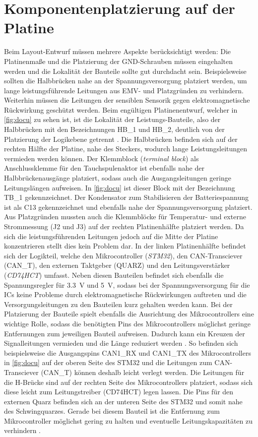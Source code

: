\section{Komponentenplatzierung auf der Platine}\label{sec:bau}
Beim Layout-Entwurf müssen mehrere Aspekte berücksichtigt werden: Die Platinenmaße und die Platzierung der GND-Schrauben müssen eingehalten werden und die Lokalität der Bauteile sollte gut durchdacht sein. Beispielsweise sollten die Halbbrücken nahe an der Spannungsversorgung platziert werden, um lange leistungsführende Leitungen aus EMV- und Platzgründen zu verhindern. Weiterhin müssen die Leitungen der sensiblen Sensorik gegen elektromagnetische Rückwirkung geschützt werden. Beim engültigen Platinenentwurf, welcher in \autoref{fig:docu} zu sehen ist, ist die Lokalität der Leistungs-Bauteile, also der Halbbrücken mit den Bezeichnungen HB\_1 und HB\_2, deutlich von der Platzierung der Logikebene getrennt \cite[S.26]{emcdes}. Die Halbbrücken befinden sich auf der rechten Hälfte der Platine, nahe des Steckers, wodurch lange Leistungsleitungen vermieden werden können. Der Klemmblock (\textit{terminal block}) als Anschlussklemme für den Tauchspulenaktor ist ebenfalls nahe der Halbbrückenausgänge platziert, sodass auch die Ausgangsleitungen geringe Leitungslängen aufweisen. In \autoref{fig:docu} ist dieser Block mit der Bezeichnung TB\_1 gekennzeichnet. Der Kondensator zum Stabilisieren der Batteriespannung ist als C13 gekennzeichnet und ebenfalls nahe der Spannungsversorgung platziert. Aus Platzgründen mussten auch die Klemmblöcke für Temperatur- und externe Strommessung (J2 und J3) auf der rechten Platinenhälfte platziert werden. Da sich die leistungsführenden Leitungen jedoch auf die Mitte der Platine konzentrieren stellt dies kein Problem dar. In der linken Platinenhälfte befindet sich der Logikteil, welche den Mikrocontroller (\textit{STM32}), den CAN-Transciever (CAN\_T), den externen Taktgeber (QUARZ) und den Leitungsverstärker (\textit{CD74HCT}) umfasst. Neben diesen Bauteilen befindet sich ebenfalls die Spannungsregler für \SI{3,3}{V} und \SI{5}{V}, sodass bei der Spannungsversorgung für die ICs keine Probleme durch elektromagnetische Rückwirkungen auftreten und die Versorgungsleitungen zu den Bauteilen kurz gehalten werden kann. Bei der Platzierung der Bauteile spielt ebenfalls die Ausrichtung des Mikrocontrollers eine wichtige Rolle, sodass die benötigten Pins des Mikrocontrollers möglichst geringe Entfernungen zum jeweiligen Bauteil aufweisen. Dadurch kann ein Kreuzen der Signalleitungen vermieden und die Länge reduziert werden \cite[S.17]{emcdes}. So befinden sich beispielsweise die Ausgangspins CAN1\_RX und CAN1\_TX des Mikrocontrollers in \autoref{fig:docu} auf der oberen Seite des STM32 und die Leitungen zum CAN-Transciever (CAN\_T) können deshalb leicht verlegt werden. Die Leitungen für die H-Brücke sind auf der rechten Seite des Mikrocontrollers platziert, sodass sich diese leicht zum Leitungstreiber (CD74HCT) legen lassen. Die Pins für den externen Quarz befinden sich an der unteren Seite des STM32 und somit nahe des Schwingquarzes. Gerade bei diesem Bauteil ist die Entfernung zum Mikrocontroller möglichst gering zu halten und eventuelle Leitungskapazitäten zu verhindern \cite[S.31]{stmquarz}. 